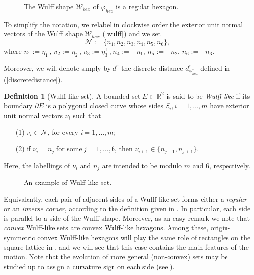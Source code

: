 \documentclass{interact}
\numberwithin{equation}{section}
\theoremstyle{definition}
\newtheorem{defn}[thm]{Definition}
\renewcommand{\epsilon}{\varepsilon}
\begin{document}
\begin{figure}[htbp]
\centering
\def\svgwidth{100pt}

\caption{The Wulff shape $\mathcal{W}_{hex}$ of $\varphi_{hex}$ is a regular hexagon.}\label{fig:1}
\end{figure}


To simplify the notation, we relabel in clockwise order the exterior unit normal vectors of the Wulff shape  $\mathcal{W}_{hex}$ (\ref{wulff}) and we set
\begin{equation}
\mathcal{N}:=\{n_1,n_2,n_3,n_4,n_5,n_6\},
\end{equation}
where $n_1:=\eta^\perp_1$, $n_2:=\eta^\perp_2$, $n_3:=\eta^\perp_3$, $n_4:=-n_1$, $n_5:=-n_2$, $n_6:=-n_3$.

Moreover, we will denote simply by $d^\epsilon$ the discrete distance $d_{\varphi^\circ_{hex}}^\epsilon$ defined in (\ref{discretedistance}).

\begin{defn}[Wulff-like set]\label{wshlikeset}
A bounded set $E\subset\mathbb{R}^2$ is said to be \emph{Wulff-like} if its boundary $\partial E$ is a polygonal closed curve whose sides $S_i, i=1,\dots,m$ have exterior unit normal vectors $\nu_i$ such that
\begin{enumerate}
\item[(1)] $\nu_i\in\mathcal{N}$, for every $i=1,\dots,m$;
\item[(2)] if $\nu_i=n_j$ for some $j=1,\dots,6$, then $\nu_{i+1}\in\{n_{j-1}, n_{j+1}\}$.
\end{enumerate}
Here, the labellings of $\nu_i$ and $n_j$ are intended to be modulo $m$ and $6$, respectively.
\end{defn}

\begin{figure}[htbp]
\centering
\def\svgwidth{150pt}

\caption{An example of Wulff-like set.}\label{fig:2}
\end{figure}

{Equivalently, each pair of adjacent sides of a Wulff-like set forms either a \emph{regular} or an \emph{inverse corner}, according to the definition given in \cite[Section~4]{AT95}. In particular, each side is parallel to a side of the Wulff shape. } %
Moreover, as an easy remark we note that \emph{convex} Wulff-like sets are convex Wulff-like hexagons. Among these, origin-symmetric convex Wulff-like hexagons will play the same role of rectangles on the square lattice in \cite{BGN}, and we will see that this case contains the main features of the motion.
Note that the evolution of more general (non-convex) sets may be studied up to assign a curvature sign on each side (see \cite[Sections 3.2-3.3]{BGN}).
\end{document}
